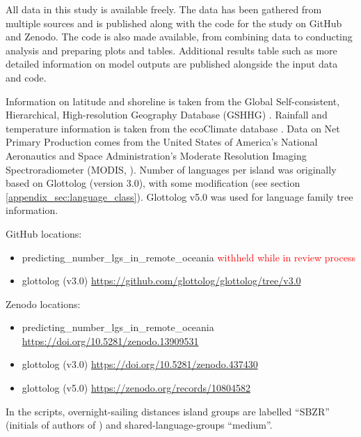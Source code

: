 \documentclass[unnumsec,webpdf,modern,medium]{oup-authoring-template}
\begin{document}
All data in this study is available freely. The data has been gathered from multiple sources and is published along with the code for the study on GitHub and Zenodo. The code is also made available, from combining data to conducting analysis and preparing plots and tables. Additional results table such as more detailed information on model outputs are published alongside the input data and code.

Information on latitude and shoreline is taken from the Global Self-consistent, Hierarchical, High-resolution Geography Database (GSHHG) \citep{wessel1996global}. Rainfall and temperature information is taken from the ecoClimate database \citep{ecoclimate}. Data on Net Primary Production comes from the  United States of America's National Aeronautics and Space Administration's Moderate Resolution Imaging Spectroradiometer (MODIS, \citet{running2021modis_terra, running2021modis_aqua}). Number of languages per island was originally based on Glottolog (version 3.0), with some modification (see section \ref{appendix_sec:language_class}). Glottolog v5.0 \citet{Glottolog5} was used for language family tree information. 

GitHub locations:
\begin{itemize}
\item predicting\_number\_lgs\_in\_remote\_oceania  \textcolor{red}{withheld while in review process}
\item glottolog (v3.0) \url{https://github.com/glottolog/glottolog/tree/v3.0}
\end{itemize}

Zenodo locations:
\begin{itemize}
\item predicting\_number\_lgs\_in\_remote\_oceania  \url{https://doi.org/10.5281/zenodo.13909531}
\item glottolog (v3.0) \url{https://doi.org/10.5281/zenodo.437430}
\item glottolog (v5.0) \url{https://zenodo.org/records/10804582}

\end{itemize}

In the scripts, overnight-sailing distances island groups are labelled ``SBZR'' (initials of authors of \cite{NZSA_overnight_2023}) and shared-language-groups ``medium''.
\newpage
\end{document}
